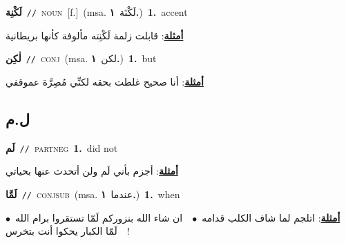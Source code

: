 \documentclass[10pt,a4paper,twoside]{article} %
\begin{document}
\begin{multicols}{2}
{\setlength\topsep{0pt}\textbf{\foreignlanguage{arabic}{لَكْنِة}}\ {\color{gray}\texttt{//}\color{black}}\ \textsc{noun}\ [f.]\ \color{gray}(msa. \foreignlanguage{arabic}{لَكْنَة}~\foreignlanguage{arabic}{\textbf{١.}})\color{black}\ \textbf{1.}~accent\  \begin{flushright}\color{gray}\foreignlanguage{arabic}{\textbf{\underline{\foreignlanguage{arabic}{أمثلة}}}: قابلت زلمة لَكْنِته مألوفة كأنها بريطانية}\end{flushright}\color{black}} \vspace{2mm}

{\setlength\topsep{0pt}\textbf{\foreignlanguage{arabic}{لٰكِن}}\ {\color{gray}\texttt{//}\color{black}}\ \textsc{conj}\ \color{gray}(msa. \foreignlanguage{arabic}{لكن}~\foreignlanguage{arabic}{\textbf{١.}})\color{black}\ \textbf{1.}~but\  \begin{flushright}\color{gray}\foreignlanguage{arabic}{\textbf{\underline{\foreignlanguage{arabic}{أمثلة}}}: أنا صحيح غلطت بحقه لكنِّي مُصِرَّة عموقفي}\end{flushright}\color{black}} \vspace{2mm}

\vspace{-3mm}
\subsection*{\color{blue}\foreignlanguage{arabic}{ل.م}\color{blue}{}} 

{\setlength\topsep{0pt}\textbf{\foreignlanguage{arabic}{لَم}}\ {\color{gray}\texttt{//}\color{black}}\ \textsc{part\textunderscore neg}\ \textbf{1.}~did not\  \begin{flushright}\color{gray}\foreignlanguage{arabic}{\textbf{\underline{\foreignlanguage{arabic}{أمثلة}}}: أجزم بأني لَم ولن أتحدث عنها بحياتي}\end{flushright}\color{black}} \vspace{2mm}

{\setlength\topsep{0pt}\textbf{\foreignlanguage{arabic}{لَمَّا}}\ {\color{gray}\texttt{//}\color{black}}\ \textsc{conj\textunderscore sub}\ \color{gray}(msa. \foreignlanguage{arabic}{عندما}~\foreignlanguage{arabic}{\textbf{١.}})\color{black}\ \textbf{1.}~when\  \begin{flushright}\color{gray}\foreignlanguage{arabic}{\textbf{\underline{\foreignlanguage{arabic}{أمثلة}}}: اتلجم لما شاف الكلب قدامه\ $\bullet$\ \  ان شاء الله بنزوركم لَمّا تستقروا برام الله\ $\bullet$\ \  لَمّا الكبار يحكوا أنت بتخرس!}\end{flushright}\color{black}} \vspace{2mm}


\end{multicols}
\end{document}
